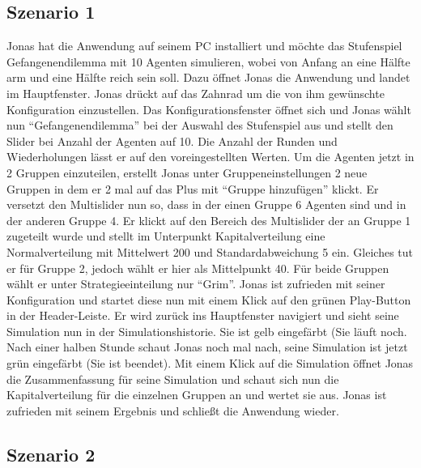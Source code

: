 \documentclass[parskip=full,11pt]{scrartcl}
\begin{document}
\subsection{Szenario 1}
Jonas hat die Anwendung auf seinem PC installiert und möchte das \Gls{Stufenspiel} Gefangenendilemma mit 10 Agenten simulieren, wobei von Anfang an eine Hälfte arm und eine Hälfte reich sein soll. Dazu öffnet Jonas die Anwendung und landet im Hauptfenster. Jonas drückt auf das Zahnrad um die von ihm gewünschte \Gls{Konfiguration} einzustellen. Das Konfigurationsfenster öffnet sich und Jonas wählt nun \enquote{Gefangenendilemma} bei der Auswahl des \Gls{Stufenspiel} aus und stellt den Slider bei Anzahl der Agenten auf 10. Die Anzahl der Runden und Wiederholungen lässt er auf den voreingestellten Werten. 
Um die Agenten jetzt in 2 Gruppen einzuteilen, erstellt Jonas unter Gruppeneinstellungen 2 neue Gruppen in dem er 2 mal auf das Plus mit \enquote{Gruppe hinzufügen} klickt. Er versetzt den \Gls{Multislider} nun so, dass in der einen Gruppe 6 Agenten sind und in der anderen Gruppe 4. Er klickt auf den Bereich des \Gls{Multislider} der an Gruppe 1 zugeteilt wurde und stellt im Unterpunkt Kapitalverteilung eine Normalverteilung mit Mittelwert 200 und Standardabweichung 5 ein. Gleiches tut er für Gruppe 2, jedoch wählt er hier als Mittelpunkt 40. Für beide Gruppen wählt er unter Strategieeinteilung nur \enquote{Grim}.
Jonas ist zufrieden mit seiner \Gls{Konfiguration} und startet diese nun mit einem Klick auf den grünen Play-Button in der Header-Leiste.
Er wird zurück ins Hauptfenster navigiert und sieht seine Simulation nun in der Simulationshistorie. Sie ist gelb eingefärbt (Sie läuft noch. Nach einer halben Stunde schaut Jonas noch mal nach, seine Simulation ist jetzt grün eingefärbt (Sie ist beendet). Mit einem Klick auf die Simulation öffnet Jonas die Zusammenfassung für seine Simulation und schaut sich nun die Kapitalverteilung für die einzelnen Gruppen an und wertet sie aus. Jonas ist zufrieden mit seinem Ergebnis und schließt die Anwendung wieder.


\subsection{Szenario 2}
\end{document}

